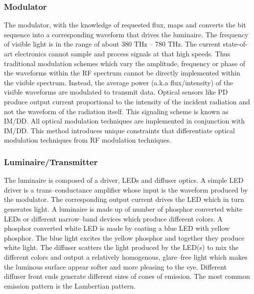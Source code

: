 \subsubsection{Modulator}
\label{subsubsec:outlineModulator}
The modulator, with the knowledge of requested flux, maps and converts the bit sequence into a corresponding waveform that drives the luminaire. The frequency of visible light is in the range of about 380 THz -- 780 THz. The current state-of-art electronics cannot sample and process signals at that high speeds. Thus traditional modulation schemes which vary the amplitude, frequency or phase of the waveforms within the RF spectrum cannot be directly implemented within the visible spectrum. Instead, the average power (a.k.a flux/intensity) of the visible waveforms are modulated to transmit data. Optical sensors like PD produce output current proportional to the intensity of the incident radiation and not the waveform of the radiation itself. This signaling scheme is known as IM/DD. All optical modulation techniques are implemented in conjunction with IM/DD. This method introduces unique constraints that differentiate optical modulation techniques from RF modulation techniques.

\subsubsection{Luminaire/Transmitter}
\label{subsubsec:outlineLuminaire}
The luminaire is composed of a driver, LEDs and diffuser optics. A simple LED driver is a trans--conductance amplifier whose input is the waveform produced by the modulator. The corresponding output current drives the LED which in turn generates light. A luminaire is made up of number of phosphor converted white LEDs or different narrow--band devices which produce different colors. A phosphor converted white LED is made by coating a blue LED with yellow phosphor. The blue light excites the yellow phosphor and together they produce white light. The diffuser scatters the light produced by the LED(s) to mix the different colors and output a relatively homogenous, glare--free light which makes the luminous surface appear softer and more pleasing to the eye. Different diffuser front ends generate different sizes of cones of emission. The most common emission pattern is the Lambertian pattern. 

